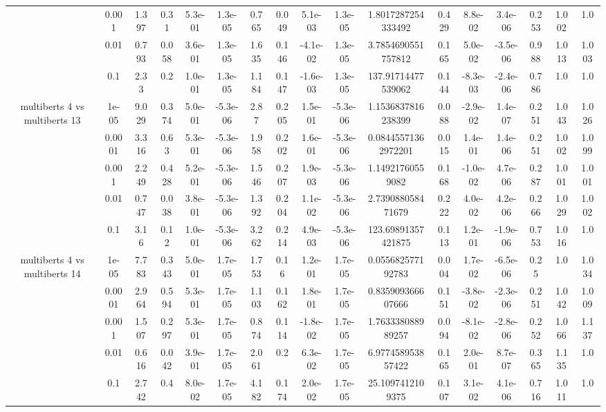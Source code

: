 \begin{tabular}{|c|c|c|c|c|c|c|c|c|c|c|c|c|c|c|c|c|}
 & 0.001 & 1.397 & 0.31 & 5.3e-01 & 1.3e-05 & 0.765 & 0.049 & 5.1e-03 & 1.3e-05 & 1.8017287254333492 & 0.429 & 8.8e-02 & 3.4e-06 & 0.253 & 1.002 & 1.0 \\
 & 0.01 & 0.793 & 0.058 & 3.6e-01 & 1.3e-05 & 1.635 & 0.146 & -4.1e-02 & 1.3e-05 & 3.7854690551757812 & 0.165 & 5.0e-02 & -3.5e-06 & 0.988 & 1.013 & 1.003 \\
 & 0.1 & 2.33 & 0.2 & 1.0e-01 & 1.3e-05 & 1.184 & 0.147 & -1.6e-03 & 1.3e-05 & 137.91714477539062 & 0.144 & -8.3e-03 & -2.4e-06 & 0.786 & 1.0 & 1.0 \\
\hline
\multirow{5}{*}{multiberts 4 vs multiberts 13} & 1e-05 & 9.029 & 0.374 & 5.0e-01 & -5.3e-06 & 2.87 & 0.205 & 1.5e-01 & -5.3e-06 & 1.1536837816238399 & 0.088 & -2.9e-02 & 1.4e-07 & 0.251 & 1.043 & 1.026 \\
 & 0.0001 & 3.316 & 0.63 & 5.3e-01 & -5.3e-06 & 1.958 & 0.202 & 1.6e-01 & -5.3e-06 & 0.08445571362972201 & 0.015 & 1.4e-01 & 1.4e-06 & 0.251 & 1.002 & 1.099 \\
 & 0.001 & 2.249 & 0.428 & 5.2e-01 & -5.3e-06 & 1.546 & 0.207 & 1.9e-03 & -5.3e-06 & 1.14921760559082 & 0.168 & -1.0e-02 & 4.7e-06 & 0.287 & 1.001 & 1.001 \\
 & 0.01 & 0.747 & 0.038 & 3.8e-01 & -5.3e-06 & 1.392 & 0.204 & 1.1e-02 & -5.3e-06 & 2.739088058471679 & 0.222 & 4.0e-02 & 4.2e-06 & 0.266 & 1.029 & 1.002 \\
 & 0.1 & 3.16 & 0.12 & 1.0e-01 & -5.3e-06 & 3.262 & 0.214 & 4.9e-03 & -5.3e-06 & 123.69891357421875 & 0.113 & 1.2e-01 & -1.9e-06 & 0.753 & 1.016 & 1.0 \\
\hline
\multirow{5}{*}{multiberts 4 vs multiberts 14} & 1e-05 & 7.783 & 0.343 & 5.0e-01 & 1.7e-05 & 1.753 & 0.16 & 1.2e-01 & 1.7e-05 & 0.055682577192783 & 0.004 & 1.7e-02 & -6.5e-06 & 0.25 & 1.0 & 1.034 \\
 & 0.0001 & 2.964 & 0.594 & 5.3e-01 & 1.7e-05 & 1.103 & 0.162 & 1.8e-01 & 1.7e-05 & 0.835909366607666 & 0.151 & -3.8e-02 & -2.3e-06 & 0.251 & 1.042 & 1.009 \\
 & 0.001 & 1.507 & 0.297 & 5.3e-01 & 1.7e-05 & 0.874 & 0.114 & -1.8e-02 & 1.7e-05 & 1.763338088989257 & 0.094 & -8.1e-02 & -2.8e-06 & 0.252 & 1.066 & 1.137 \\
 & 0.01 & 0.616 & 0.042 & 3.9e-01 & 1.7e-05 & 2.061 & 0.2 & 6.3e-02 & 1.7e-05 & 6.977458953857422 & 0.165 & 2.0e-01 & 8.7e-07 & 0.365 & 1.135 & 1.0 \\
 & 0.1 & 2.742 & 0.4 & 8.0e-02 & 1.7e-05 & 4.182 & 0.174 & 2.0e-02 & 1.7e-05 & 25.1097412109375 & 0.107 & 3.1e-02 & 4.1e-06 & 0.716 & 1.011 & 1.0 \\

\end{tabular}
